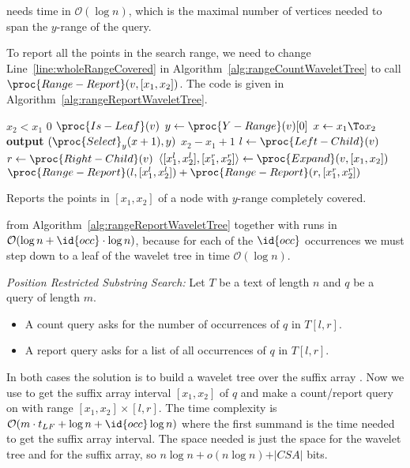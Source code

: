 \begin{Proof}
   needs time in $\mathcal{O}(\log n)$, which is the maximal number of vertices needed to span the $y$-range of the query.

  To report all the points in the search range, we need to change Line~\ref{line:wholeRangeCovered} in Algorithm~\ref{alg:rangeCountWaveletTree} to call $\proc{Range-Report}(v, [x_1, x_2])$. The code is given in Algorithm~\ref{alg:rangeReportWaveletTree}.

  \begin{algorithm}[htb]
    \begin{codebox}
      \li \If $x_2 < x_1$
          \Then
      \li   \Return $0$
          \End
      \li \If $\proc{Is-Leaf}(v)$
          \Then
      \li   $y \gets \proc{Y-Range}(v)[0]$
      \li   \For $x \gets x_1 \To x_2$
            \Do
      \li     \textbf{output} $(\proc{Select}_y(x + 1), y)$
            \End
      \li   \Return $x_2 - x_1 + 1$
      \li \Else
      \li   $l \gets \proc{Left-Child}(v)$
      \li   $r \gets \proc{Right-Child}(v)$
      \li   $\langle [x_1^l, x_2^l], [x_1^r, x_2^r] \rangle \gets \proc{Expand}(v, [x_1, x_2])$
      \li   \Return $\proc{Range-Report}(l, [x_1^l, x_2^l]) + \proc{Range-Report}(r, [x_1^r, x_2^r])$
          \End
    \end{codebox}
    \caption{Reports the points in $[x_1, x_2]$ of a node with $y$-range completely covered.}
    \label{alg:rangeReportWaveletTree}
  \end{algorithm}

   from Algorithm~\ref{alg:rangeReportWaveletTree} together with  runs in $\mathcal{O}(\log n + \id{occ} \cdot \log n)$, because for each of the $\id{occ}$ occurrences we must step down to a leaf of the wavelet tree in time $\mathcal{O}(\log n)$.
\end{Proof}

\begin{Example}{\emph{Position Restricted Substring Search:}}
  Let $T$ be a text of length $n$ and $q$ be a query of length $m$.
  \begin{itemize}
    \item A count query asks for the number of occurrences of $q$ in $T[l,r]$.
    \item A report query asks for a list of all occurrences of $q$ in $T[l,r]$.
  \end{itemize}
  In both cases the solution is to build a wavelet tree  over the suffix array . Now we use  to get the suffix array interval $[x_1, x_2]$ of $q$ and make a count/report query on  with range $[x_1, x_2] \times [l, r]$. The time complexity is $\mathcal{O}(m \cdot t_{LF} + \log n + \id{occ}\log n)$ where the first summand is the time needed to get the suffix array interval. The space needed is just the space for the wavelet tree and for the suffix array, so $n \log n + o(n \log n) + \vert CSA\vert$ bits.
\end{Example}

